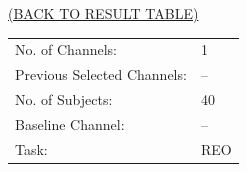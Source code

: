 \documentclass[oneside, a4paper,10pt]{report}
\begin{document}
\newpage

\hspace*{12cm}\hyperlink{tab:TestResults}{(BACK TO RESULT TABLE)}

\bigskip
\bigskip

\begin{tabular}{ll}
  No. of Channels: & 1\\
  Previous Selected Channels: & --\\
  No. of Subjects: & 40\\
  Baseline Channel: & --\\
  Task:	& REO 
\end{tabular}

\bigskip
\end{document}
